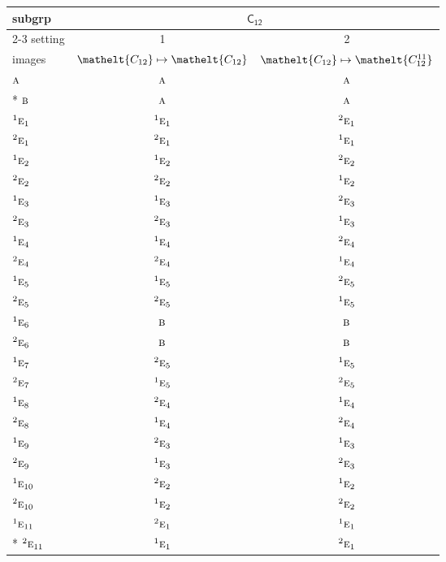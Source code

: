 \documentclass[10pt,a4paper]{article}
\numberwithin{equation}{section}
\newcommand{\eltfont}[1]{{\let\sigma\eltsigma\mathelt{#1}}}
\newcommand{\grp}[1]{\mathsf{#1}}
\newcommand{\irr}[1]{\text{\normalfont\scshape #1}}
\newcommand{\conjpair}[1]{{}^{#1}}
\newcommand{\cls}[1]{\eltfont{#1}}
\begin{document}
{\small\begin{longtable}{@{}lcc@{}}\toprule
subgrp & \multicolumn{2}{c}{\href{C12.pdf}{$\grp{C_{12}}$}}\\\cmidrule(lr){2-3}
setting & 1 & 2\\
images & {\scriptsize $\cls{C_{12}} \mapsto \cls{C_{12}}$} & {\scriptsize $\cls{C_{12}} \mapsto \cls{C_{12}^{11}}$}\\\midrule\endhead
\bottomrule\endfoot\endlastfoot
$\irr{a}$ & $\irr{a}$ & $\irr{a}$\\*
$\irr{b}$ & $\irr{a}$ & $\irr{a}$\\
$\conjpair{1}\irr{e}_{1}$ & $\conjpair{1}\irr{e}_{1}$ & $\conjpair{2}\irr{e}_{1}$\\
$\conjpair{2}\irr{e}_{1}$ & $\conjpair{2}\irr{e}_{1}$ & $\conjpair{1}\irr{e}_{1}$\\
$\conjpair{1}\irr{e}_{2}$ & $\conjpair{1}\irr{e}_{2}$ & $\conjpair{2}\irr{e}_{2}$\\
$\conjpair{2}\irr{e}_{2}$ & $\conjpair{2}\irr{e}_{2}$ & $\conjpair{1}\irr{e}_{2}$\\
$\conjpair{1}\irr{e}_{3}$ & $\conjpair{1}\irr{e}_{3}$ & $\conjpair{2}\irr{e}_{3}$\\
$\conjpair{2}\irr{e}_{3}$ & $\conjpair{2}\irr{e}_{3}$ & $\conjpair{1}\irr{e}_{3}$\\
$\conjpair{1}\irr{e}_{4}$ & $\conjpair{1}\irr{e}_{4}$ & $\conjpair{2}\irr{e}_{4}$\\
$\conjpair{2}\irr{e}_{4}$ & $\conjpair{2}\irr{e}_{4}$ & $\conjpair{1}\irr{e}_{4}$\\
$\conjpair{1}\irr{e}_{5}$ & $\conjpair{1}\irr{e}_{5}$ & $\conjpair{2}\irr{e}_{5}$\\
$\conjpair{2}\irr{e}_{5}$ & $\conjpair{2}\irr{e}_{5}$ & $\conjpair{1}\irr{e}_{5}$\\
$\conjpair{1}\irr{e}_{6}$ & $\irr{b}$ & $\irr{b}$\\
$\conjpair{2}\irr{e}_{6}$ & $\irr{b}$ & $\irr{b}$\\
$\conjpair{1}\irr{e}_{7}$ & $\conjpair{2}\irr{e}_{5}$ & $\conjpair{1}\irr{e}_{5}$\\
$\conjpair{2}\irr{e}_{7}$ & $\conjpair{1}\irr{e}_{5}$ & $\conjpair{2}\irr{e}_{5}$\\
$\conjpair{1}\irr{e}_{8}$ & $\conjpair{2}\irr{e}_{4}$ & $\conjpair{1}\irr{e}_{4}$\\
$\conjpair{2}\irr{e}_{8}$ & $\conjpair{1}\irr{e}_{4}$ & $\conjpair{2}\irr{e}_{4}$\\
$\conjpair{1}\irr{e}_{9}$ & $\conjpair{2}\irr{e}_{3}$ & $\conjpair{1}\irr{e}_{3}$\\
$\conjpair{2}\irr{e}_{9}$ & $\conjpair{1}\irr{e}_{3}$ & $\conjpair{2}\irr{e}_{3}$\\
$\conjpair{1}\irr{e}_{10}$ & $\conjpair{2}\irr{e}_{2}$ & $\conjpair{1}\irr{e}_{2}$\\
$\conjpair{2}\irr{e}_{10}$ & $\conjpair{1}\irr{e}_{2}$ & $\conjpair{2}\irr{e}_{2}$\\
$\conjpair{1}\irr{e}_{11}$ & $\conjpair{2}\irr{e}_{1}$ & $\conjpair{1}\irr{e}_{1}$\\*
$\conjpair{2}\irr{e}_{11}$ & $\conjpair{1}\irr{e}_{1}$ & $\conjpair{2}\irr{e}_{1}$\\
\bottomrule\end{longtable}}
\end{document}
